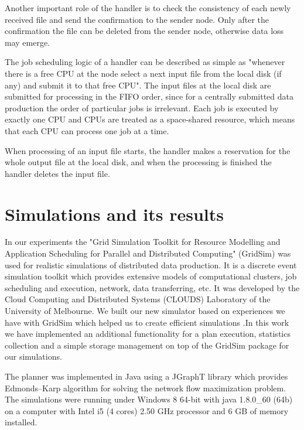 \documentclass{svjour3}                     %
\begin{document}
Another important role of the handler is to check the consistency of each newly received file and send the confirmation to the sender node. Only after the confirmation the file can be deleted from the sender node, otherwise data loss may emerge. 

The job scheduling logic of a handler can be described as simple as "whenever there is a free CPU at the node select a next input file from the local disk (if any) and submit it to that free CPU". The input files at the local disk are submitted for processing in the FIFO order, since for a centrally submitted data production the order of particular jobs is irrelevant. Each job is executed by exactly one CPU and CPUs are treated as a space-shared resource, which means that each CPU can process one job at a time.

When processing of an input file starts, the handler makes a reservation for the whole output file at the local disk, and when the processing is finished the handler deletes the input file.

\section{Simulations and its results}
\label{simulations}
In our experiments the "Grid Simulation Toolkit for Resource Modelling and Application Scheduling for Parallel and Distributed Computing" (GridSim) \cite{GridSim} was used for realistic simulations of distributed data production. It is a discrete event simulation toolkit which provides extensive models of computational clusters, job scheduling and execution, network, data transferring, etc. It was developed by the Cloud Computing and Distributed Systems (CLOUDS) Laboratory of the University of Melbourne. We built our new simulator based on experiences we have with GridSim which helped us to create efficient simulations \cite{alea2}.In this work we have implemented an additional functionality for a plan execution, statistics collection and a simple storage management   on top of the GridSim package for our simulations.

The planner was implemented in Java using a JGraphT \cite{JGraphT} library which provides Edmonds–Karp algorithm \cite{Network_flows} for solving the network flow maximization problem. The simulations were running under Windows 8 64-bit with java 1.8.0\_60 (64b) on a computer with Intel i5 (4 cores) 2.50 GHz processor and 6 GB of memory installed. 
\end{document}
